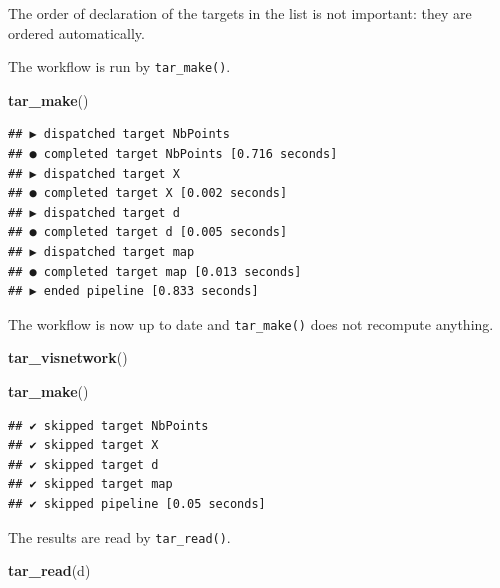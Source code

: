 \documentclass[
  12pt,
  american,
  a4paper,
  extrafontsizes,onecolumn,openright
  ]{memoir}
\newenvironment{Shaded}{\begin{snugshade}}{\end{snugshade}}
\newcommand{\FunctionTok}[1]{\textcolor[rgb]{0.13,0.29,0.53}{\textbf{#1}}}
\newcommand{\NormalTok}[1]{#1}
\begin{document}
\normalsize

The order of declaration of the targets in the list is not important: they are ordered automatically.

The workflow is run by \texttt{tar\_make()}.

\scriptsize

\begin{Shaded}
\begin{Highlighting}[]
\FunctionTok{tar\_make}\NormalTok{()}
\end{Highlighting}
\end{Shaded}

\begin{verbatim}
## ▶ dispatched target NbPoints
## ● completed target NbPoints [0.716 seconds]
## ▶ dispatched target X
## ● completed target X [0.002 seconds]
## ▶ dispatched target d
## ● completed target d [0.005 seconds]
## ▶ dispatched target map
## ● completed target map [0.013 seconds]
## ▶ ended pipeline [0.833 seconds]
\end{verbatim}

\normalsize

The workflow is now up to date and \texttt{tar\_make()} does not recompute anything.

\scriptsize

\begin{Shaded}
\begin{Highlighting}[]
\FunctionTok{tar\_visnetwork}\NormalTok{()}
\end{Highlighting}
\end{Shaded}

\begin{Shaded}
\begin{Highlighting}[]
\FunctionTok{tar\_make}\NormalTok{()}
\end{Highlighting}
\end{Shaded}

\begin{verbatim}
## ✔ skipped target NbPoints
## ✔ skipped target X
## ✔ skipped target d
## ✔ skipped target map
## ✔ skipped pipeline [0.05 seconds]
\end{verbatim}

\normalsize

The results are read by \texttt{tar\_read()}.

\scriptsize

\begin{Shaded}
\begin{Highlighting}[]
\FunctionTok{tar\_read}\NormalTok{(d)}
\end{Highlighting}
\end{Shaded}
\end{document}
